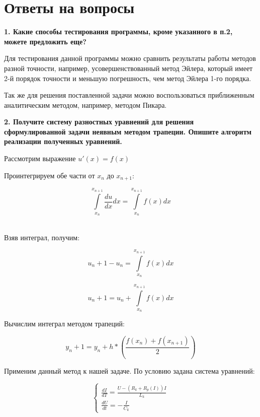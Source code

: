\chapter{Ответы на вопросы}


\hspace{0cm} \textbf{1. Какие способы тестирования программы, кроме указанного в п.2, можете предложить еще?}

Для тестирования данной программы можно сравнить результаты работы методов разной точности, например, усовершенствованный метод Эйлера, который имеет 2-й порядок точности и меньшую погрешность, чем метод Эйлера 1-го порядка.

Так же для решения поставленной задачи можно воспользоваться приближенным аналитическим методом, например, методом Пикара.
\bigskip\bigskip\bigskip

\hspace{0cm} \textbf{2. Получите систему разностных уравнений для решения сформулированной задачи неявным методом трапеции. Опишите алгоритм реализации полученных уравнений.}

Рассмотрим выражение $u'(x) = f(x)$

Проинтегрируем обе части от $x_n$ до $x_{n+1}$:

\begin{equation*}
    \int\limits_{x_n}^{x_{n+1}}\frac{du}{dx}dx = \int\limits_{x_n}^{x_{n+1}}f(x)dx
\end{equation*} \

Взяв интеграл, получим:

\begin{equation*}
    u_n+1 - u_n = \int\limits_{x_n}^{x_{n+1}}f(x)dx 
\end{equation*}

\begin{equation*}
    u_n+1 = u_n + \int\limits_{x_n}^{x_{n+1}}f(x)dx
\end{equation*}

Вычислим интеграл методом трапеций:

\begin{equation*}
    y_n+1 = y_n + h * (\frac{f(x_n) + f(x_{n+1})}{2})
\end{equation*}

Применим данный метод к нашей задаче.
По условию задана система уравнений:

\begin{equation*}
    \begin{cases}
        \frac{dI}{dT} = \frac{U - (R_k + R_p (I))I}{L_k}\\
        \frac{dU}{dt} = -\frac{I}{C_k}
    \end{cases}
\end{equation*} \\

